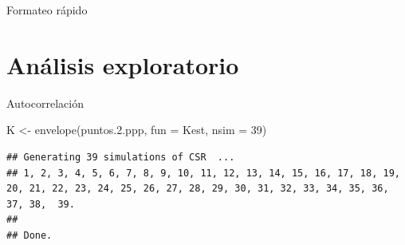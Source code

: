 \documentclass[
  11pt,
  ignorenonframetext,
]{beamer}
\newenvironment{Shaded}{}{}
\newcommand{\AttributeTok}[1]{\textcolor[rgb]{0.49,0.56,0.16}{#1}}
\newcommand{\DecValTok}[1]{\textcolor[rgb]{0.25,0.63,0.44}{#1}}
\newcommand{\FloatTok}[1]{\textcolor[rgb]{0.25,0.63,0.44}{#1}}
\newcommand{\FunctionTok}[1]{\textcolor[rgb]{0.02,0.16,0.49}{#1}}
\newcommand{\NormalTok}[1]{#1}
\newcommand{\OtherTok}[1]{\textcolor[rgb]{0.00,0.44,0.13}{#1}}
\newcommand{\SpecialCharTok}[1]{\textcolor[rgb]{0.25,0.44,0.63}{#1}}
\begin{document}
\begin{frame}[fragile]{Formateo rápido}
\protect\hypertarget{formateo-ruxe1pido}{}
\begin{Shaded}
\end{Shaded}
\end{frame}

\hypertarget{anuxe1lisis-exploratorio}{%
\section{Análisis exploratorio}\label{anuxe1lisis-exploratorio}}

\begin{frame}[fragile]{Autocorrelación}
\protect\hypertarget{autocorrelaciuxf3n}{}
\begin{Shaded}
\begin{Highlighting}[]
\NormalTok{K }\OtherTok{\textless{}{-}} \FunctionTok{envelope}\NormalTok{(puntos.}\FloatTok{2.}\NormalTok{ppp, }\AttributeTok{fun =}\NormalTok{ Kest, }\AttributeTok{nsim =} \DecValTok{39}\NormalTok{)}
\end{Highlighting}
\end{Shaded}

\begin{verbatim}
## Generating 39 simulations of CSR  ...
## 1, 2, 3, 4, 5, 6, 7, 8, 9, 10, 11, 12, 13, 14, 15, 16, 17, 18, 19, 20, 21, 22, 23, 24, 25, 26, 27, 28, 29, 30, 31, 32, 33, 34, 35, 36, 37, 38,  39.
## 
## Done.
\end{verbatim}
\end{frame}
\end{document}

